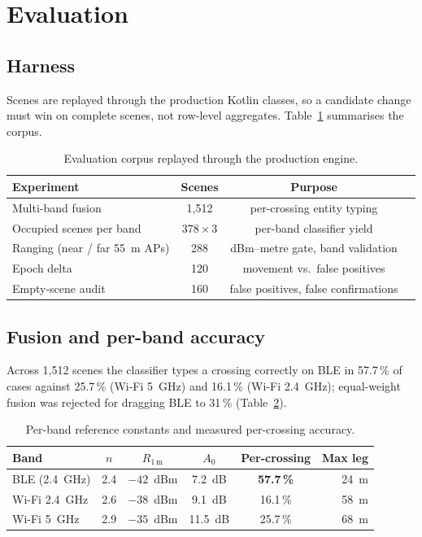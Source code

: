 \documentclass[journal,10pt]{IEEEtran}
\begin{document}
\section{Evaluation}

\subsection{Harness}
Scenes are replayed through the production Kotlin classes, so a candidate
change must win on complete scenes, not row-level aggregates.
Table~\ref{tab:corpus} summarises the corpus.

\begin{table}[t]
  \centering
  \caption{Evaluation corpus replayed through the production engine.}
  \label{tab:corpus}
  \footnotesize
  \begin{tabular}{@{}lccc@{}}
    \toprule
    Experiment & Scenes & Purpose \\
    \midrule
    Multi-band fusion & 1,512 & per-crossing entity typing \\
    Occupied scenes per band & $378 \times 3$ & per-band classifier yield \\
    Ranging (near / far 55~m APs) & 288 & dBm--metre gate, band validation \\
    Epoch delta & 120 & movement vs.\ false positives \\
    Empty-scene audit & 160 & false positives, false confirmations \\
    \bottomrule
  \end{tabular}
\end{table}

\subsection{Fusion and per-band accuracy}
Across 1,512 scenes the classifier types a crossing correctly on BLE in
57.7\,\% of cases against 25.7\,\% (Wi-Fi 5~GHz) and 16.1\,\% (Wi-Fi 2.4~GHz);
equal-weight fusion was rejected for dragging BLE to 31\,\%
(Table~\ref{tab:bands}).

\begin{table}[t]
  \centering
  \caption{Per-band reference constants and measured per-crossing accuracy.}
  \label{tab:bands}
  \footnotesize
  \begin{tabular}{@{}lccccr@{}}
    \toprule
    Band & $n$ & $R_{1\,\mathrm{m}}$ & $A_0$ & Per-crossing & Max leg \\
    \midrule
    BLE (2.4~GHz) & 2.4 & $-42$~dBm & 7.2~dB & \textbf{57.7\,\%} & 24~m \\
    Wi-Fi 2.4~GHz & 2.6 & $-38$~dBm & 9.1~dB & 16.1\,\% & 58~m \\
    Wi-Fi 5~GHz & 2.9 & $-35$~dBm & 11.5~dB & 25.7\,\% & 68~m \\
    \bottomrule
  \end{tabular}
\end{table}
\end{document}
